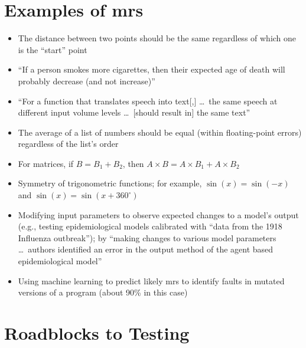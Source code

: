 \section[Examples of Metamorphic Relations]{Examples of \acfp{mr}}
\begin{itemize}
    \item The distance between two points should be the same regardless of
          which one is the ``start'' point \citep[p.~22]{IEEE2021c}
    \item ``If a person smokes more cigarettes, then their expected age of
          death will probably decrease (and not increase)''
          \citep[p.~22]{IEEE2021c}
    \item ``For a function that translates speech into text[,] \dots\ the
          same speech at different input volume levels \dots\ [should result
          in] the same text'' \citep[p.~22]{IEEE2021c}
    \item The average of a list of numbers should be equal (within
          floating-point errors) regardless of the list's order
          \citep[p.~67]{KanewalaAndYuehChen2019}
    \item For matrices, if $B = B_1 + B_2$, then $A \times B = A \times B_1
              + A \times B_2$ \citep[pp.~68-69]{KanewalaAndYuehChen2019}
    \item Symmetry of trigonometric functions; for example, $\sin(x) = \sin(-x)$
          and $\sin(x) = \sin(x + 360^{\circ})$ \citep[p.~70]{KanewalaAndYuehChen2019}
    \item Modifying input parameters to observe expected changes to a model's
          output (e.g., testing epidemiological models calibrated with
          ``data from the 1918 Influenza outbreak''); by ``making changes to
          various model parameters \dots\ authors identified an error in the
          output method of the agent based epidemiological model''
          \citep[p.~70]{KanewalaAndYuehChen2019}
    \item Using machine learning to predict likely \acsp{mr} to identify
          faults in mutated versions of a program (about 90\% in this case)
          \citep[p.~71]{KanewalaAndYuehChen2019}
\end{itemize}

\section{Roadblocks to Testing}

